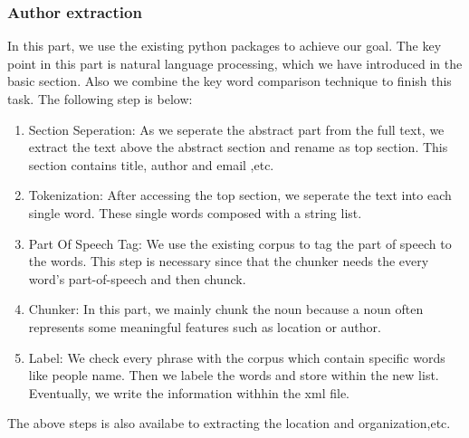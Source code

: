 \subsubsection*{Author extraction}
In this part, we use the existing python packages to achieve our goal. 
The key point in this part is natural language processing, which we have introduced in the basic section. 
Also we combine the key word comparison technique to finish this task. The following step is below:

\begin{enumerate}
	\item Section Seperation: As we seperate the abstract part from the full text, we extract the text above the abstract section and rename as top section. This section contains title, author and email ,etc.
	\item Tokenization: After accessing the top section, we seperate the text into each single word. These single words composed with a string list. 
	\item Part Of Speech Tag: We use the existing corpus to tag the part of speech to the words. This step is necessary since that the chunker needs the every word's part-of-speech and then chunck.
	\item Chunker: In this part, we mainly chunk the noun  because a noun often represents some meaningful features such as location or author.
	\item Label: We check every phrase with the corpus which contain specific words like people name. Then we labele the words and store within the new list. Eventually, we write the information withhin the xml file. 
\end{enumerate}


The above steps is also availabe to extracting the location and organization,etc.
